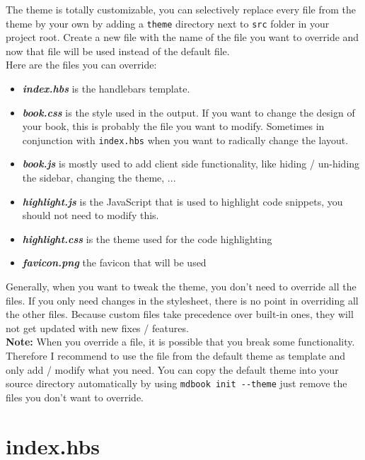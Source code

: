 \documentclass{article}
\begin{document}
The theme is totally customizable, you can selectively replace every file from
the theme by your own by adding a \lstinline|theme| directory next to \lstinline|src| folder in your
project root. Create a new file with the name of the file you want to override
and now that file will be used instead of the default file.\\

Here are the files you can override:\\
\begin{itemize}
\item \emph{\textbf{index.hbs}} is the handlebars template.
\item \emph{\textbf{book.css}} is the style used in the output. If you want to change the
design of your book, this is probably the file you want to modify. Sometimes
in conjunction with \lstinline|index.hbs| when you want to radically change the layout.
\item \emph{\textbf{book.js}} is mostly used to add client side functionality, like hiding /
un-hiding the sidebar, changing the theme, ...
\item \emph{\textbf{highlight.js}} is the JavaScript that is used to highlight code snippets,
you should not need to modify this.
\item \emph{\textbf{highlight.css}} is the theme used for the code highlighting
\item \emph{\textbf{favicon.png}} the favicon that will be used
\end{itemize}

Generally, when you want to tweak the theme, you don't need to override all the
files. If you only need changes in the stylesheet, there is no point in
overriding all the other files. Because custom files take precedence over
built-in ones, they will not get updated with new fixes / features.\\

\textbf{Note:} When you override a file, it is possible that you break some
functionality. Therefore I recommend to use the file from the default theme as
template and only add / modify what you need. You can copy the default theme
into your source directory automatically by using \lstinline|mdbook init --theme| just
remove the files you don't want to override.\\

\section{index.hbs}
\label{index.hbs}
\label{index-hbs}
\end{document}

